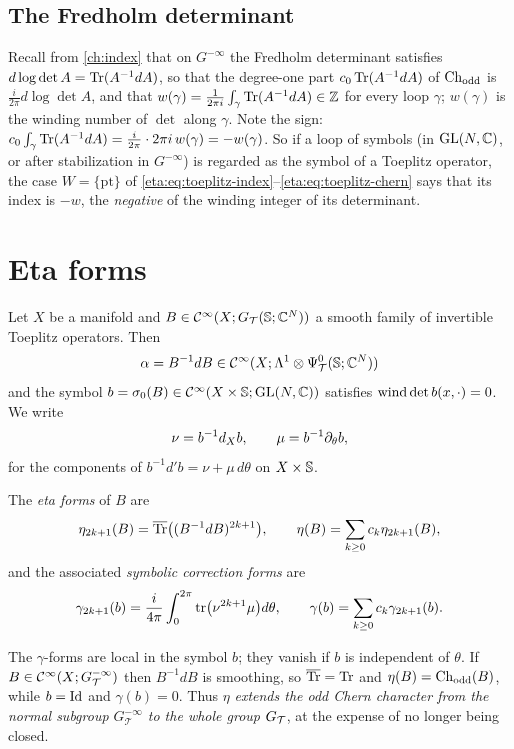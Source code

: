 \subsection{The Fredholm determinant} Recall from \cref{ch:index} that on $G^{-\infty}$
the Fredholm determinant satisfies $d\log\det A=\operatorname{Tr}(A^{-1}dA)$, so that the degree-one
part $c_0\operatorname{Tr}(A^{-1}dA)$ of $\operatorname{Ch}_{\mathrm{odd}}$ is $\frac{i}{2\pi}d\log\det A$, and that
$w(\gamma)=\frac1{2\pi i}\int_\gamma\operatorname{Tr}(A^{-1}dA)\in\mathbb{Z}$ for every loop $\gamma$; $w(\gamma)$ is
the winding number of $\det$ along $\gamma$. Note the sign: $c_0\int_\gamma\operatorname{Tr}(A^{-1}dA)
=\frac{i}{2\pi}\cdot2\pi i\,w(\gamma)=-w(\gamma)$. So if a loop of symbols (in
$\operatorname{GL}(N,\mathbb{C})$, or after stabilization in $G^{-\infty}$) is regarded as the symbol of a
Toeplitz operator, the case $W=\{\mathrm{pt}\}$ of
\eqref{eta:eq:toeplitz-index}--\eqref{eta:eq:toeplitz-chern} says that its index is
$-w$, the \emph{negative} of the winding integer of its determinant.

\section{Eta forms}\label{eta:sec:eta}

Let $X$ be a manifold and $B\in\mathcal{C}^\infty(X;G_{\mathcal{T}}(\mathbb{S};\mathbb{C}^N))$ a smooth family of invertible
Toeplitz operators. Then
\[
\alpha=B^{-1}dB\in\mathcal{C}^\infty(X;\Lambda^1\otimes\Psi^{0}_{\mathcal{T}}(\mathbb{S};\mathbb{C}^N))
\]
and the symbol $b=\sigma_0(B)\in\mathcal{C}^\infty(X\times\mathbb{S};\operatorname{GL}(N,\mathbb{C}))$ satisfies $\operatorname{wind}\det b(x,\cdot)=0$.
We write
\[
\nu=b^{-1}d_Xb,\qquad\mu=b^{-1}\partial_\theta b,
\]
for the components of $b^{-1}d'b=\nu+\mu\,d\theta$ on $X\times\mathbb{S}$.

\begin{definition}\label{eta:def:eta}
The \emph{eta forms} of $B$ are
\[
\eta_{2k+1}(B)=\overline{\operatorname{Tr}}\bigl((B^{-1}dB)^{2k+1}\bigr),\qquad\eta(B)=\sum_{k\ge0}c_k\eta_{2k+1}(B),
\]
and the associated \emph{symbolic correction forms} are
\[
\gamma_{2k+1}(b)=\frac{i}{4\pi}\int_0^{2\pi}\operatorname{tr}\bigl(\nu^{2k+1}\mu\bigr)d\theta,\qquad
\gamma(b)=\sum_{k\ge0}c_k\gamma_{2k+1}(b).
\]
\end{definition}

The $\gamma$-forms are local in the symbol $b$; they vanish if $b$ is independent of
$\theta$. If $B\in\mathcal{C}^\infty(X;G^{-\infty}_{\mathcal T})$ then $B^{-1}dB$ is smoothing, so
$\overline{\operatorname{Tr}}=\operatorname{Tr}$ and $\eta(B)=\operatorname{Ch}_{\mathrm{odd}}(B)$, while $b=\operatorname{Id}$ and $\gamma(b)=0$. Thus $\eta$
\emph{extends the odd Chern character from the normal subgroup $G^{-\infty}_{\mathcal T}$
to the whole group} $G_{\mathcal{T}}$, at the expense of no longer being closed.

